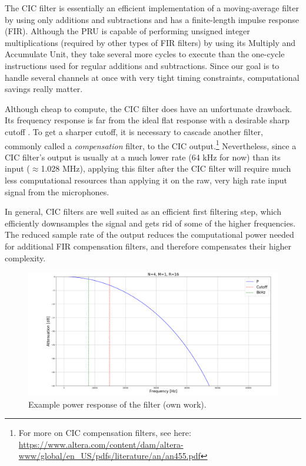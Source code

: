 \documentclass[]{report}
\begin{document}
The CIC filter is essentially an efficient implementation of a moving-average filter by using only additions and subtractions and has a finite-length impulse response (FIR). Although the PRU is capable of performing unsigned integer multiplications (required by other types of FIR filters) by using its Multiply and Accumulate Unit, they take several more cycles to execute than the one-cycle instructions used for regular additions and subtractions. Since our goal is to handle several channels at once with very tight timing constraints, computational savings really matter.

Although cheap to compute, the CIC filter does have an unfortunate drawback. Its frequency response is far from the ideal flat response with a desirable sharp cutoff . To get a sharper cutoff, it is necessary to cascade another filter, commonly called a \emph{compensation} filter, to the CIC output.\footnote{For more on CIC compensation filters, see here: \url{https://www.altera.com/content/dam/altera-www/global/en_US/pdfs/literature/an/an455.pdf}} Nevertheless, since a CIC filter's output is usually at a much lower rate (64 kHz for now) than its input ($ \approx $1.028 MHz), applying this filter after the CIC filter will require much less computational resources than applying it on the raw, very high rate input signal from the microphones.

In general, CIC filters are well suited as an efficient first filtering step, which efficiently downsamples the signal and gets rid of some of the higher frequencies. The reduced sample rate of the output reduces the computational power needed for additional FIR compensation filters, and therefore compensates their higher complexity.

\begin{figure}
\centering
\includegraphics[width=0.9\linewidth]{Pictures/CIC_power_resp.png}
\caption{Example power response of the filter (own work).}
\end{figure}
\end{document}
